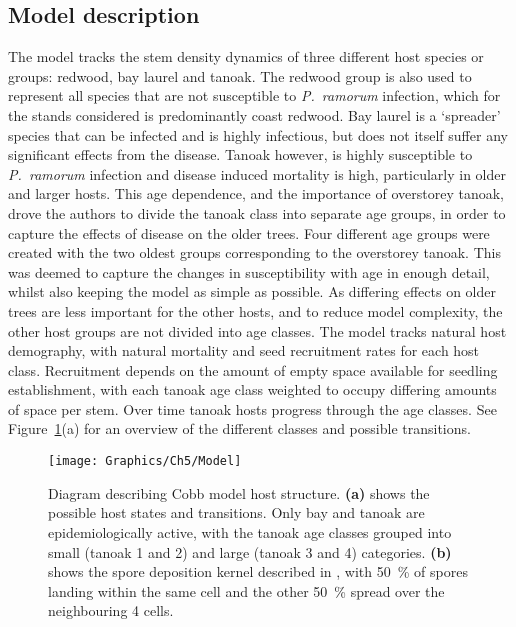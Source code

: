 \subsection{Model description}

The model tracks the stem density dynamics of three different host species or groups: redwood, bay laurel and tanoak. The redwood group is also used to represent all species that are not susceptible to \textit{P.~ramorum} infection, which for the stands considered is predominantly coast redwood. Bay laurel is a `spreader' species that can be infected and is highly infectious, but does not itself suffer any significant effects from the disease. Tanoak however, is highly susceptible to \textit{P.~ramorum} infection and disease induced mortality is high, particularly in older and larger hosts. This age dependence, and the importance of overstorey tanoak, drove the authors to divide the tanoak class into separate age groups, in order to capture the effects of disease on the older trees. Four different age groups were created with the two oldest groups corresponding to the overstorey tanoak. This was deemed to capture the changes in susceptibility with age in enough detail, whilst also keeping the model as simple as possible. As differing effects on older trees are less important for the other hosts, and to reduce model complexity, the other host groups are not divided into age classes. The model tracks natural host demography, with natural mortality and seed recruitment rates for each host class. Recruitment depends on the amount of empty space available for seedling establishment, with each tanoak age class weighted to occupy differing amounts of space per stem. Over time tanoak hosts progress through the age classes. See Figure~\ref{fig:ch5:model_description}(a) for an overview of the different classes and possible transitions.

\begin{figure}
\centering
    \texttt{[image: Graphics/Ch5/Model]}
    \caption[Mixed stand model structure]{Diagram describing Cobb model host structure. \textbf{(a)} shows the possible host states and transitions. Only bay and tanoak are epidemiologically active, with the tanoak age classes grouped into small (tanoak 1 and 2) and large (tanoak 3 and 4) categories.  \textbf{(b)} shows the spore deposition kernel described in \citet{cobb_ecosystem_2012}, with \SI{50}{\percent} of spores landing within the same cell and the other \SI{50}{\percent} spread over the neighbouring 4 cells.\label{fig:ch5:model_description}}
\end{figure}

